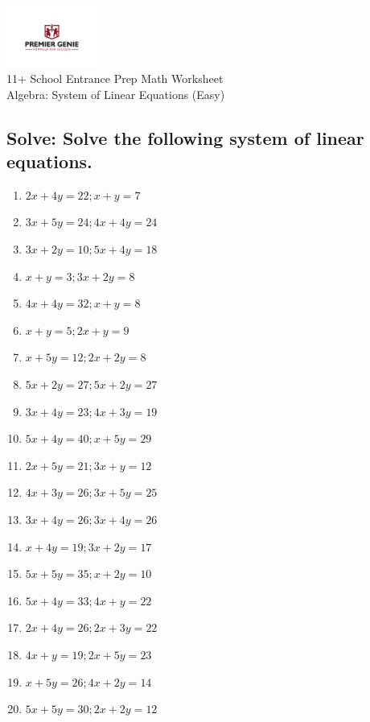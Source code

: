 \documentclass{article}
\begin{document}
\begin{center}
\includegraphics[width=3cm]{PREMGENIEJPG.jpg}\\
{\Large 11+ School Entrance Prep Math Worksheet}\\
{\Medium Algebra: System of Linear Equations (Easy)}\\

\end{center}

\subsection*{Solve: Solve the following system of linear equations.}

\begin{enumerate}
\item $\displaystyle {2 x + 4 y}=22 ; {x + y}=7 $ \ 
\item $\displaystyle {3 x + 5 y}=24 ; {4 x + 4 y}=24 $ \ 
\item $\displaystyle {3 x + 2 y}=10 ; {5 x + 4 y}=18 $ \ 
\item $\displaystyle {x + y}=3 ; {3 x + 2 y}=8 $ \ 
\item $\displaystyle {4 x + 4 y}=32 ; {x + y}=8 $ \ 
\item $\displaystyle {x + y}=5 ; {2 x + y}=9 $ \ 
\item $\displaystyle {x + 5 y}=12 ; {2 x + 2 y}=8 $ \ 
\item $\displaystyle {5 x + 2 y}=27 ; {5 x + 2 y}=27 $ \ 
\item $\displaystyle {3 x + 4 y}=23 ; {4 x + 3 y}=19 $ \ 
\item $\displaystyle {5 x + 4 y}=40 ; {x + 5 y}=29 $ \ 
\item $\displaystyle {2 x + 5 y}=21 ; {3 x + y}=12 $ \ 
\item $\displaystyle {4 x + 3 y}=26 ; {3 x + 5 y}=25 $ \ 
\item $\displaystyle {3 x + 4 y}=26 ; {3 x + 4 y}=26 $ \ 
\item $\displaystyle {x + 4 y}=19 ; {3 x + 2 y}=17 $ \ 
\item $\displaystyle {5 x + 5 y}=35 ; {x + 2 y}=10 $ \ 
\item $\displaystyle {5 x + 4 y}=33 ; {4 x + y}=22 $ \ 
\item $\displaystyle {2 x + 4 y}=26 ; {2 x + 3 y}=22 $ \ 
\item $\displaystyle {4 x + y}=19 ; {2 x + 5 y}=23 $ \ 
\item $\displaystyle {x + 5 y}=26 ; {4 x + 2 y}=14 $ \ 
\item $\displaystyle {5 x + 5 y}=30 ; {2 x + 2 y}=12 $ \ 


\end{enumerate}
\end{document}
